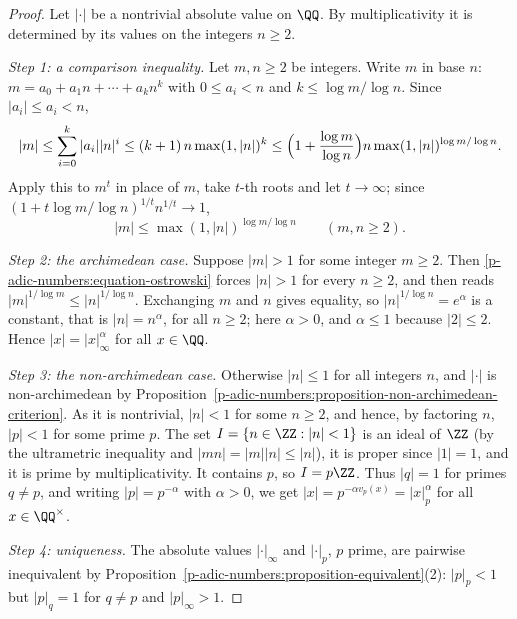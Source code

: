 \begin{proof}
Let $|\cdot|$ be a nontrivial absolute value on $\QQ$. By multiplicativity it is determined by its values on the integers $n \geq 2$.

\emph{Step 1: a comparison inequality.} Let $m, n \geq 2$ be integers. Write $m$ in base $n$: $m = a_0 + a_1n + \cdots + a_kn^k$ with $0 \leq a_i < n$ and $k \leq \log m/\log n$. Since $|a_i| \leq a_i < n$,
\[
|m| \leq \sum_{i=0}^k|a_i||n|^i \leq (k + 1)\,n\max(1, |n|)^k \leq \Bigl(1 + \frac{\log m}{\log n}\Bigr)n\max(1, |n|)^{\log m/\log n} .
\]
Apply this to $m^t$ in place of $m$, take $t$-th roots and let $t \to \infty$; since $(1 + t\log m/\log n)^{1/t}n^{1/t} \to 1$,
\begin{equation}\label{p-adic-numbers:equation-ostrowski}
|m| \leq \max(1, |n|)^{\log m/\log n} \qquad (m, n \geq 2).
\end{equation}

\emph{Step 2: the archimedean case.} Suppose $|m| > 1$ for some integer $m \geq 2$. Then \eqref{p-adic-numbers:equation-ostrowski} forces $|n| > 1$ for every $n \geq 2$, and then reads
$|m|^{1/\log m} \leq |n|^{1/\log n}$. Exchanging $m$ and $n$ gives equality, so $|n|^{1/\log n} = e^\alpha$ is a constant, that is $|n| = n^\alpha$, for all $n \geq 2$; here $\alpha > 0$, and
$\alpha \leq 1$ because $|2| \leq 2$. Hence $|x| = |x|_\infty^\alpha$ for all $x \in \QQ$.

\emph{Step 3: the non-archimedean case.} Otherwise $|n| \leq 1$ for all integers $n$, and $|\cdot|$ is non-archimedean by Proposition~\ref{p-adic-numbers:proposition-non-archimedean-criterion}. As it is
nontrivial, $|n| < 1$ for some $n \geq 2$, and hence, by factoring $n$, $|p| < 1$ for some prime $p$. The set $I = \{n \in \ZZ : |n| < 1\}$ is an ideal of $\ZZ$ (by the ultrametric inequality and
$|mn| = |m||n| \leq |n|$), it is proper since $|1| = 1$, and it is prime by multiplicativity. It contains $p$, so $I = p\ZZ$. Thus $|q| = 1$ for primes $q \neq p$, and writing $|p| = p^{-\alpha}$ with
$\alpha > 0$, we get $|x| = p^{-\alpha v_p(x)} = |x|_p^\alpha$ for all $x \in \QQ^\times$.

\emph{Step 4: uniqueness.} The absolute values $|\cdot|_\infty$ and $|\cdot|_p$, $p$ prime, are pairwise inequivalent by Proposition~\ref{p-adic-numbers:proposition-equivalent}(2): $|p|_p < 1$ but
$|p|_q = 1$ for $q \neq p$ and $|p|_\infty > 1$.
\end{proof}

